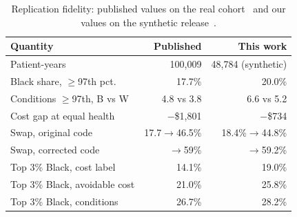 \begin{table}[t]
\centering
\caption{Replication fidelity: published values on the real cohort~\cite{obermeyer2019} and our values on the synthetic release~\cite{labsysmed}.}
\label{tab:fidelity}
\setlength{\tabcolsep}{4pt}
\begin{tabular}{@{}lrr@{}}
\toprule
Quantity & Published & This work \\
\midrule
Patient-years & 100,009 & 48,784 (synthetic) \\
Black share, $\geq$97th pct. & 17.7\% & 20.0\% \\
Conditions $\geq$97th, B vs W & 4.8 vs 3.8 & 6.6 vs 5.2 \\
Cost gap at equal health & $-$\$1{,}801 & $-$\$734 \\
Swap, original code & 17.7$\rightarrow$46.5\% & 18.4\%$\rightarrow$44.8\% \\
Swap, corrected code & $\rightarrow$59\% & $\rightarrow$59.2\% \\
Top 3\% Black, cost label & 14.1\% & 19.0\% \\
Top 3\% Black, avoidable cost & 21.0\% & 25.8\% \\
Top 3\% Black, conditions & 26.7\% & 28.2\% \\
\bottomrule
\end{tabular}
\end{table}
